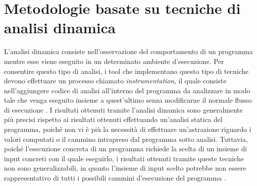 \documentclass[../main.tex]{subfiles}
\begin{document}
\section{Metodologie basate su tecniche di analisi dinamica}
L'analisi dinamica consiste nell'osservazione del comportamento di un programma mentre esse viene eseguito in un determinato ambiente d'esecuzione.
Per consentire questo tipo di analisi, i tool che implementano questo tipo di tecniche devono effettuare un processo chiamato \textit{instrumentation}, il quale
consiste nell'aggiungere codice di analisi all'interno del programma da analizzare in modo tale che venga eseguito insieme a quest'ultimo senza modificarne il normale
flusso di esecuzione \cite{DBA_DBI}. I risultati ottenuti tramite l'analisi dinamica sono generalmente più precisi rispetto ai risultati ottenuti effettuando un'analisi statica
del programma, poiché non vi è più la necessità di effettuare un'astrazione riguardo i valori computati o il cammino intrapreso dal programma sotto analisi.
Tuttavia, poiché l'esecuzione concreta di un programma richiede la scelta di un insieme di input concreti con il quale eseguirlo, i risultati ottenuti tramite queste tecniche non sono
generalizzabili, in quanto l'insieme di input scelto potrebbe non essere rappresentativo di tutti i possibili cammini d'esecuzione del programma \cite{Synergy_Duality}.
\end{document}
